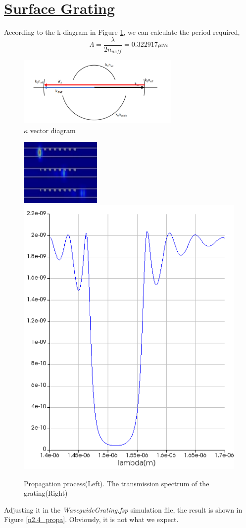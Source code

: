 \documentclass[fontsize=11pt]{scrartcl}
\begin{document}
\section{\uline{Surface Grating}}
According to the k-diagram in Figure \ref{k-dia-BR}, we can calculate the period required,
\begin{equation}
    \Lambda=\frac\lambda{2n_{neff}}=0.322917\mu m
\end{equation}
\begin{figure}[H]
    \centering
    \includegraphics[width=0.7\textwidth]{img/k-dia-BR.png}
    \caption{$\kappa$ vector diagram}
    \label{k-dia-BR}
\end{figure}
\begin{figure}[H]
    \centering
    \includegraphics[width=0.35\textwidth]{img/n2.4_mov.png}
    \hspace{10mm}
    \includegraphics[height=0.4\textwidth]{img/n2.4_T.png}
    \caption{Propagation process(Left). The transmission spectrum of the grating(Right) }
    \label{n2.4_porpa}
\end{figure}
Adjusting it in the \textit{WaveguideGrating.fsp} simulation file,
the result is shown in Figure \ref{n2.4_propa}. Obviously, it is not what we expect.
\end{document}
